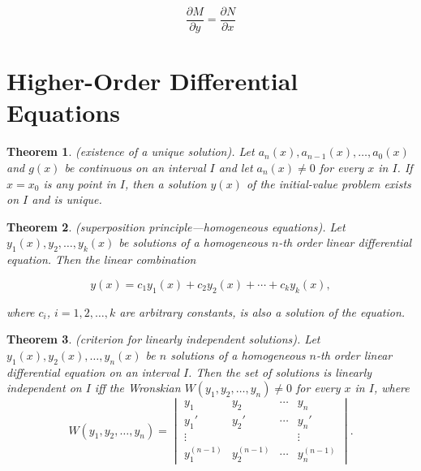 \documentclass{article}
\theoremstyle{plain}
\newtheorem{thm}{Theorem}[section]
\theoremstyle{definition}
\theoremstyle{remark}
\begin{document}
\begin{equation}
    \frac{\partial M}{\partial y} = \frac{\partial N}{\partial x}
\end{equation}

\section{Higher-Order Differential Equations}

\begin{thm} (existence of a unique solution).
Let \(a_n(x), a_{n-1}(x), \ldots, a_0(x)\) and \(g(x)\) be continuous on an interval \(I\) and let \(a_n(x)\neq 0\) for every \(x\) in \(I\). If \(x = x_0\) is any point in \(I\), then a solution \(y(x)\) of the initial-value problem exists on \(I\) and is unique.
\end{thm}

\begin{thm} (superposition principle—homogeneous equations).
    Let \(y_1(x), y_2, \ldots, y_k(x)\) be solutions of a homogeneous \(n\)-th order linear differential equation. Then the linear combination

\begin{equation}
    y(x) = c_1y_1(x) + c_2y_2(x) + \cdots + c_ky_k(x),
\end{equation}

\noindent where \(c_i\), \(i = 1, 2, \ldots, k\) are arbitrary constants, is also a solution of the equation.
\end{thm}

\begin{thm} (criterion for linearly independent solutions).
    Let \(y_1(x), y_2(x), \ldots, y_n(x)\) be \(n\) solutions of a homogeneous \(n\)-th order linear differential equation on an interval \(I\). Then the set of solutions is linearly independent on \(I\) iff the Wronskian \(W(y_1, y_2, \ldots, y_n) \neq 0\) for every \(x\) in \(I\), where
    \begin{equation}
        W(y_1, y_2, \ldots, y_n) = \begin{vmatrix}
            y_1 & y_2 & \cdots & y_n\\
            y_1' & y_2' & \cdots & y_n'\\
            \vdots & & & \vdots\\
            y_1^{(n-1)} & y_2^{(n-1)} & \cdots & y_n^{(n-1)}
        \end{vmatrix}.
    \end{equation}
\end{thm}
\end{document}
